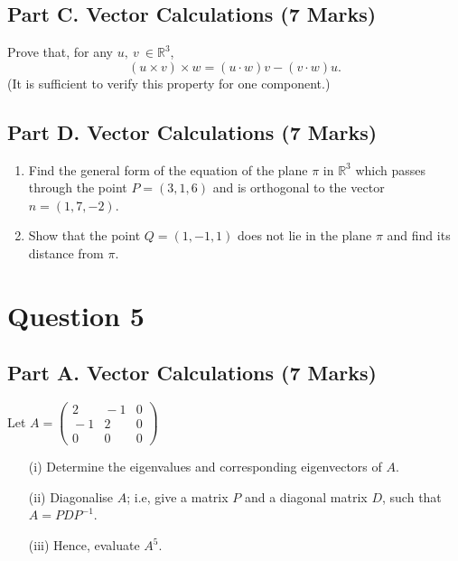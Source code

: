 \documentclass[a4paper,12pt]{article}
\begin{document}
	\subsection*{Part C. Vector Calculations (7 Marks)}		
 Prove that, for any $u,\:v\:\in\mathbb{R}^3$, %
			$$(u\times v)\times w= (u\cdot w)v - (v\cdot w)u.$$
			(It is sufficient to verify this property for one component.)

	\subsection*{Part D. Vector Calculations (7 Marks)}
			\begin{enumerate}
				\item Find the general form of the equation of the plane $\pi$ in $\mathbb{R}^3$ which passes through the point 
				$P=(3,1,6)$ and is orthogonal to the vector $n=(1,7,-2)$. %
				
				\item Show that the point $Q=(1,-1,1)$ does not lie in the plane $\pi$ and find its distance from $\pi$. %
			\end{enumerate}

\newpage
\section*{Question 5}
	\subsection*{Part A. Vector Calculations (7 Marks)}
 Let $A=\displaystyle\left(\begin{array}{ccc} 
	2&\!\!\!-1&0\\
	\!\!\!-1& 2&0\\
	0& 0& 0\end{array}\right)$
	
	\begin{itemize}
		\item[(i)] Determine the eigenvalues and corresponding eigenvectors of $A$.
		
		\medskip\item[(ii)]  Diagonalise $A$; i.e, give a matrix $P$ and a diagonal matrix $D$, such that $A=PDP^{-1}$.
		
		\medskip \item[(iii)]  Hence, evaluate $A^5$.
	\end{itemize} \vspace{0.4cm}
	
\end{document}

